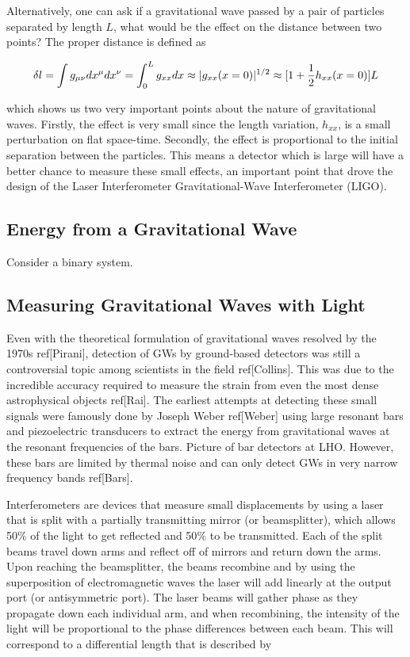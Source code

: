 	Alternatively, one can ask if a gravitational wave passed by a pair of particles separated by length $L$, what would be the effect on the distance between two points?  The proper distance is defined as

	\begin{equation}\label{propdist}
	\delta l
	= \int{g_{\mu \nu} dx^{\mu} dx^{\nu}} \\
	= \int_{0}^{L}{g_{xx} {d}x}\\
	\approx |g_{xx}(x=0)|^{1/2}\\
	\approx [ 1 + \frac{1}{2} h_{xx}(x=0)] L
	\end{equation} 
	
	which shows us two very important points about the nature of gravitational waves.  Firstly, the effect is very small since the length variation, $h_{xx}$, is a small perturbation on flat space-time.  Secondly, the effect is proportional to the initial separation between the particles. This means a detector which is large will have a better chance to measure these small effects, an important point that drove the design of the Laser Interferometer Gravitational-Wave Interferometer (LIGO).
	
	
	\subsection{Energy from a Gravitational Wave}
	Consider a binary system.
	

	\subsection{Measuring Gravitational Waves with Light}\label{measuringGWs}
	Even with the theoretical formulation of gravitational waves resolved by the 1970s ref[Pirani], detection of GWs by ground-based detectors was still a controversial topic among scientists in the field ref[Collins].  This was due to the incredible accuracy required to measure the strain from even the most dense astrophysical objects ref[Rai].  The earliest attempts at detecting these small signals were famously done by Joseph Weber ref[Weber] using large resonant bars and piezoelectric transducers to extract the energy from gravitational waves at the resonant frequencies of the bars. Picture of bar detectors at LHO.  However, these bars are limited by thermal noise and can only detect GWs in very narrow frequency bands ref[Bars]. 
	
	Interferometers are devices that measure small displacements by using a laser that is split with a partially transmitting mirror (or beamsplitter), which allows 50$\%$ of the light to get reflected and 50$\%$ to be transmitted.  Each of the split beams travel down arms and reflect off of mirrors and return down the arms.  Upon reaching the beamsplitter, the beams recombine and by using the superposition of electromagnetic waves the laser will add linearly at the output port (or antisymmetric port).  The laser beams will gather phase as they propagate down each individual arm, and when recombining, the intensity of the light will be proportional to the phase differences between each beam.  This will correspond to a differential length that is described by
	
